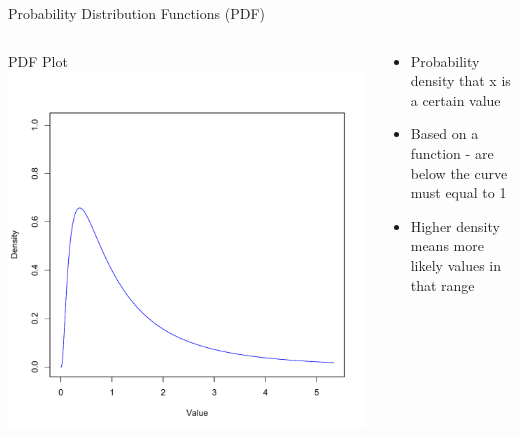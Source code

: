 \documentclass{beamer}
\begin{document}
\begin{frame}{Probability Distribution Functions (PDF)}
\begin{columns}    
	\begin{column}{4cm}        
		\begin{center}
		PDF Plot           
	 	\includegraphics[width=1.0\textwidth]{Figure2}        
		\end{center}   
	 \end{column}    
	\begin{column}{5cm}        
	  
	\begin{itemize}
	\item Probability density that x is a certain value
	\item Based on a function - are below the curve must equal to 1
	\item Higher density means more likely values in that range
	\end{itemize}
	\end{column}
	\end{columns}

\end{frame}
\end{document}
